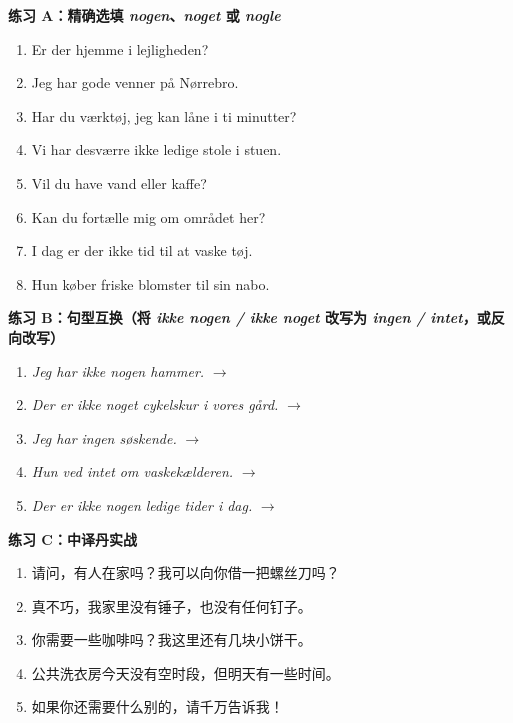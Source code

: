 \textbf{练习 A：精确选填 \textit{nogen}、\textit{noget} 或 \textit{nogle}}
\begin{enumerate}
  \item Er der \underline{\hspace{2.0cm}} hjemme i lejligheden?
  \item Jeg har \underline{\hspace{2.0cm}} gode venner på Nørrebro.
  \item Har du \underline{\hspace{2.0cm}} værktøj, jeg kan låne i ti minutter?
  \item Vi har desværre ikke \underline{\hspace{2.0cm}} ledige stole i stuen.
  \item Vil du have \underline{\hspace{2.0cm}} vand eller kaffe?
  \item Kan du fortælle mig \underline{\hspace{2.0cm}} om området her?
  \item I dag er der ikke \underline{\hspace{2.0cm}} tid til at vaske tøj.
  \item Hun køber \underline{\hspace{2.0cm}} friske blomster til sin nabo.
\end{enumerate}

\textbf{练习 B：句型互换（将 \textit{ikke nogen / ikke noget} 改写为 \textit{ingen / intet}，或反向改写）}
\begin{enumerate}
  \item \textit{Jeg har ikke nogen hammer.} $\rightarrow$ \underline{\hspace{5.5cm}}
  \item \textit{Der er ikke noget cykelskur i vores gård.} $\rightarrow$ \underline{\hspace{5.5cm}}
  \item \textit{Jeg har ingen søskende.} $\rightarrow$ \underline{\hspace{5.5cm}}
  \item \textit{Hun ved intet om vaskekælderen.} $\rightarrow$ \underline{\hspace{5.5cm}}
  \item \textit{Der er ikke nogen ledige tider i dag.} $\rightarrow$ \underline{\hspace{5.5cm}}
\end{enumerate}

\textbf{练习 C：中译丹实战}
\begin{enumerate}
  \item 请问，有人在家吗？我可以向你借一把螺丝刀吗？
  \item 真不巧，我家里没有锤子，也没有任何钉子。
  \item 你需要一些咖啡吗？我这里还有几块小饼干。
  \item 公共洗衣房今天没有空时段，但明天有一些时间。
  \item 如果你还需要什么别的，请千万告诉我！
\end{enumerate}

